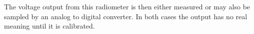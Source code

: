 The voltage output from this radiometer is then either measured or may also be sampled by an analog to digital converter.  In both cases the output has no real meaning until it is calibrated.





